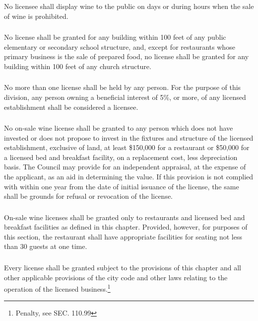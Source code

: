 \subsubsection{}
No licensee shall display wine to the public on days or during hours when the sale of wine is prohibited.
\subsubsection{}
No license shall be granted for any building within 100 feet of any public elementary or secondary school structure, and, except for restaurants whose primary business is the sale of prepared food, no license shall be granted for any building within 100 feet of any church structure.
\subsubsection{}
No more than one license shall be held by any person.  For the purpose of this division, any person owning a beneficial interest of 5\%, or more, of any licensed establishment shall be considered a licensee.
\subsubsection{}
No on-sale wine license shall be granted to any person which does not have invested or does not propose to invest in the fixtures and structure of the licensed establishment, exclusive of land, at least \$150,000 for a restaurant or \$50,000 for a licensed bed and breakfast facility, on a replacement cost, less depreciation basis.  The Council may provide for an independent appraisal, at the expense of the applicant, as an aid in determining the value.  If this provision is not complied with within one year from the date of initial issuance of the license, the same shall be grounds for refusal or revocation of the license.
\subsubsection{}
On-sale wine licenses shall be granted only to restaurants and licensed bed and breakfast facilities as defined in this chapter.  Provided, however, for purposes of this section, the restaurant shall have appropriate facilities for seating not less than 30 guests at one time.
\subsubsection{}
Every license shall be granted subject to the provisions of this chapter and all other applicable provisions of the city code and other laws relating to the operation of the licensed business.\footnote{Penalty, see SEC. 110.99}

